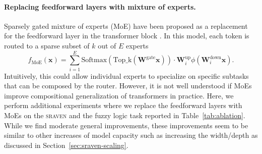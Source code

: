 \documentclass{article} \usepackage{iclr2025,times}
\begin{document}
\paragraph{Replacing feedforward layers with mixture of experts.}
Sparsely gated mixture of experts (MoE) have been proposed as a replacement for the feedforward layer in the transformer block \citep{shazeer_outrageously_2017}.
In this model, each token is routed to a sparse subset of $k$ out of $E$ experts
$$f_{\mathrm{MoE}}(\bm{x})= \sum_{i=1}^{E}\mathrm{Softmax}(\mathrm{Top\_k}(\bm{W}^{\text{gate}}\bm{x}))\cdot\bm{W}^{\mathrm{up}}_i\phi(\bm{W}^{\mathrm{down}}_i\bm{x}).$$
Intuitively, this could allow individual experts to specialize on specific subtasks that can be composed by the router.
However, it is not well understood if MoEs improve compositional generalization of transformers in practice.
Here, we perform additional experiments where we replace the feedforward layers with MoEs on the \textsc{sraven} and the fuzzy logic task reported in Table~\ref{tab:ablation}.
While we find moderate general improvements, these improvements seem to be similar to other increases of model capacity such as increasing the width/depth as discussed in Section~\ref{sec:sraven-scaling}.
\end{document}
